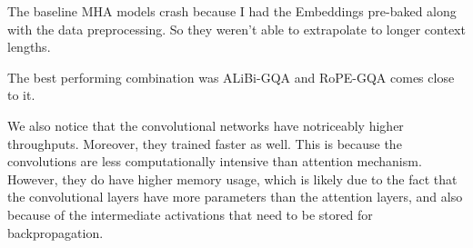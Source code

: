 \documentclass[10pt]{article}
\theoremstyle{plain}
\begin{document}
\begin{remark}
  The baseline MHA models crash because I had the Embeddings pre-baked along with the data preprocessing. So they weren't able to extrapolate to longer context lengths. 

  The best performing combination was ALiBi-GQA and RoPE-GQA comes close to it.

  We also notice that the convolutional networks have notriceably higher throughputs. Moreover, they trained faster as well. This is because the convolutions are less computationally intensive than attention mechanism. However, they do have higher memory usage, which is likely due to the fact that the convolutional layers have more parameters than the attention layers, and also because of the intermediate activations that need to be stored for backpropagation.
\end{remark}
\end{document}
